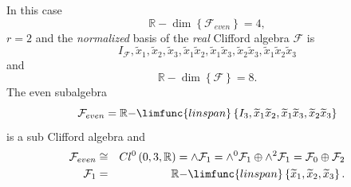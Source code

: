 \documentclass[aps,preprint]{revtex4}
\begin{document}
In this case 
\begin{equation}
\mathbb{R}-\dim \left\{ \mathcal{F}_{even}\right\} =4,
\end{equation}%
$r=2$ and the \emph{normalized} basis of the \emph{real} Clifford algebra $%
\mathcal{F}$ is 
\begin{equation}
I_{\mathcal{F}},\widetilde{x}_{1},\widetilde{x}_{2},\widetilde{x}_{3},%
\widetilde{x}_{1}\widetilde{x}_{2},\widetilde{x}_{1}\widetilde{x}_{3},%
\widetilde{x}_{2}\widetilde{x}_{3},\widetilde{x}_{1}\widetilde{x}_{2}%
\widetilde{x}_{3}
\end{equation}%
and 
\begin{equation}
\mathbb{R}-\dim \left\{ \mathcal{F}\right\} =8.
\end{equation}%
The even subalgebra 
\begin{equation}
\mathcal{F}_{even}=\mathbb{R-}\limfunc{linspan}\left\{ I_{3},\widetilde{x}%
_{1}\widetilde{x}_{2},\widetilde{x}_{1}\widetilde{x}_{3},\widetilde{x}_{2}%
\widetilde{x}_{3}\right\}
\end{equation}%
is a sub Clifford algebra and 
\begin{eqnarray}
\mathcal{F}_{even} &\cong &Cl^{0}\left( 0,3,\mathbb{R}\right) =\wedge 
\mathcal{F}_{1}=\wedge ^{0}\mathcal{F}_{1}\oplus \wedge ^{2}\mathcal{F}_{1}=%
\mathcal{F}_{0}\oplus \mathcal{F}_{2} \\
\mathcal{F}_{1} &=&\mathbb{R-}\limfunc{linspan}\left\{ \widetilde{x}_{1},%
\widetilde{x}_{2},\widetilde{x}_{3}\right\} .
\end{eqnarray}
\end{document}
